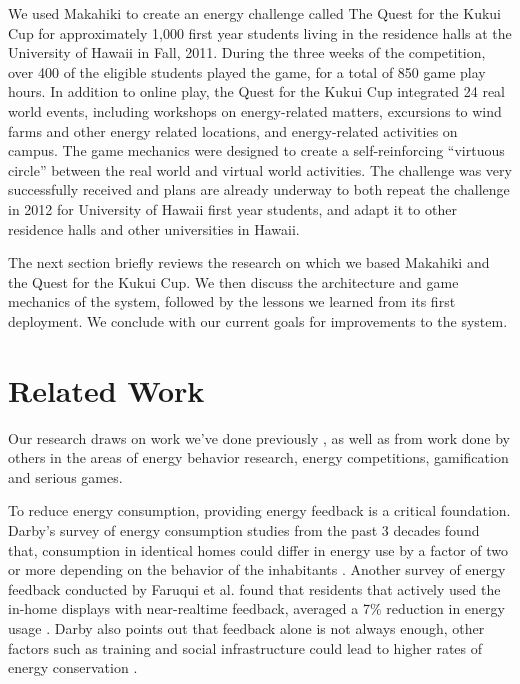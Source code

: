 \documentclass{acm_proc_article-sp}
\begin{document}
We used Makahiki to create an energy challenge called The Quest for the
Kukui Cup for approximately 1,000 first year students living in the
residence halls at the University of Hawaii in Fall, 2011.  During the
three weeks of the competition, over 400 of the eligible students played
the game, for a total of 850 game play hours.  In addition to online play,
the Quest for the Kukui Cup integrated 24 real world events, including
workshops on energy-related matters, excursions to wind farms and other
energy related locations, and energy-related activities on campus. The game
mechanics were designed to create a self-reinforcing ``virtuous circle''
between the real world and virtual world activities.  The challenge was
very successfully received and plans are already underway to both repeat
the challenge in 2012 for University of Hawaii first year students, and 
adapt it to other residence halls and other universities in Hawaii.

The next section briefly reviews the research on which we based Makahiki
and the Quest for the Kukui Cup.   We then discuss the architecture and
game mechanics of the system, followed by the lessons we learned from its
first deployment. We conclude with our current goals for improvements to
the system.

\section{Related Work}
Our research draws on work we've done previously
 \cite{csdl2-11-03,csdl2-10-05,csdl2-10-07,csdl2-11-02}, as well as from
work done by others in the areas of energy behavior research, energy 
competitions, gamification and serious games. 

To reduce energy consumption, providing energy feedback is a critical 
foundation. Darby's survey of energy consumption studies from the past 3 
decades found  that, consumption in identical homes could differ in energy use 
by a factor of two or more depending on the behavior of the inhabitants
 \cite{darby-review-2006}. Another survey of energy feedback conducted by 
Faruqui et al. found that residents that actively used the in-home displays 
with near-realtime feedback, averaged a 7\% reduction in energy usage
 \cite{Faruqui09}. Darby also points out that feedback alone is not always 
enough, other factors such as training and social infrastructure could lead to 
higher rates of energy conservation \cite{darby-2000-making-it-obvious}.
\end{document}
